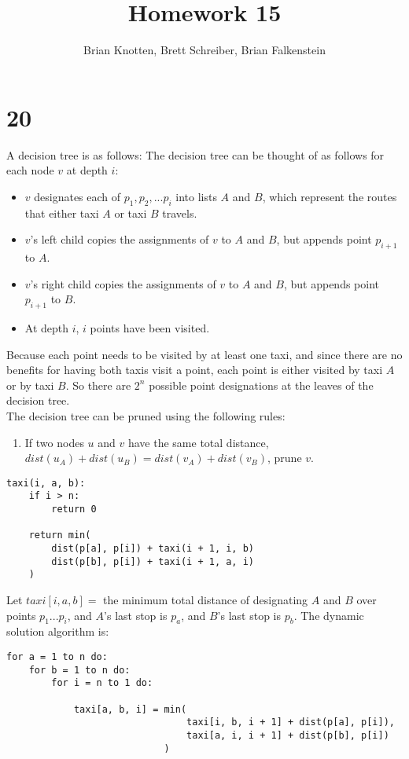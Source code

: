 \documentclass[letterpaper,notitlepage,twoside]{article}
\begin{document}
\title{Homework 15}
\author{Brian Knotten, Brett Schreiber, Brian Falkenstein}
\maketitle

\section*{20}
A decision tree is as follows:
The decision tree can be thought of as follows for each node $v$ at depth $i$:
\begin{itemize}
  \item $v$ designates each of $p_1,p_2,...p_i$ into lists $A$ and $B$, which represent the routes that either taxi $A$ or taxi $B$ travels.
  \item $v$'s left child copies the assignments of $v$ to $A$ and $B$, but appends point $p_{i + 1}$ to $A$.
  \item $v$'s right child copies the assignments of $v$ to $A$ and $B$, but appends point $p_{i + 1}$ to $B$.
  \item At depth $i$, $i$ points have been visited.
\end{itemize}
Because each point needs to be visited by at least one taxi, and since there are no benefits for having both taxis visit a point, each point is either visited by taxi $A$ or by taxi $B$. So there are $2^n$ possible point designations at the leaves of the decision tree. \\
The decision tree can be pruned using the following rules:
\begin{enumerate}
  \item If two nodes $u$ and $v$ have the same total distance, $dist(u_A) + dist(u_B) = dist(v_A) + dist(v_B)$, prune $v$.
  
\end{enumerate}

\begin{verbatim}
taxi(i, a, b):
    if i > n:
        return 0
    
    return min(
        dist(p[a], p[i]) + taxi(i + 1, i, b)
        dist(p[b], p[i]) + taxi(i + 1, a, i)
    )
\end{verbatim}

Let $taxi[i, a, b] =$ the minimum total distance of designating $A$ and $B$ over points $p_1...p_i$, and $A$'s last stop is $p_a$, and $B$'s last stop is $p_b$. The dynamic solution algorithm is:

\begin{verbatim}
for a = 1 to n do:
    for b = 1 to n do:
        for i = n to 1 do:
        
            taxi[a, b, i] = min(
                                taxi[i, b, i + 1] + dist(p[a], p[i]),
					            taxi[a, i, i + 1] + dist(p[b], p[i])
				            )
\end{verbatim}
\end{document}
